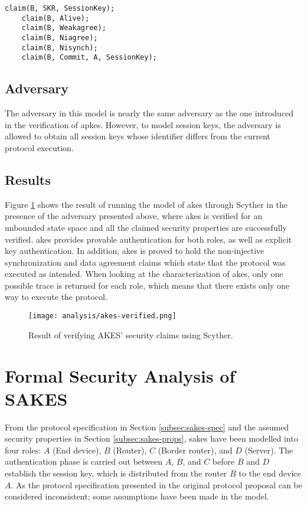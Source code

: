 \begin{lstlisting}[caption={Security claims for role B in AKES.}, label={lst:claims-b-akes}, style=code-listings]
	claim(B, SKR, SessionKey);
	claim(B, Alive);
	claim(B, Weakagree);
	claim(B, Niagree);
	claim(B, Nisynch);
	claim(B, Commit, A, SessionKey);
\end{lstlisting}

\subsection{Adversary}

The adversary in this model is nearly the same adversary as the one introduced in the verification of \gls{apkes}. However, to model session keys, the adversary is allowed to obtain all session keys whose identifier differs from the current protocol execution. 

\subsection{Results}

Figure \ref{fig:akes-verified} shows the result of running the model of \gls{akes} through Scyther in the presence of the adversary presented above, where \gls{akes} is verified for an unbounded state space and all the claimed security properties are successfully verified. \gls{akes} provides provable authentication for both roles, as well as explicit key authentication. In addition, \gls{akes} is proved to hold the non-injective synchronization and data agreement claims which state that the protocol was executed as intended. When looking at the characterization of \gls{akes}, only one possible trace is returned for each role, which means that there exists only one way to execute the protocol.

\begin{figure}[h]
	\centering
	\texttt{[image: analysis/akes-verified.png]}
	\caption{Result of verifying AKES' security claims using Scyther.}
	\label{fig:akes-verified}
\end{figure}


\section{Formal Security Analysis of SAKES}
\label{sec:sakes-analysis}

From the protocol specification in Section \ref{subsec:sakes-spec} and the assumed security properties in Section \ref{subsec:sakes-props}, \gls{sakes} have been modelled into four roles: $A$ (End device), $B$ (Router), $C$ (Border router), and $D$ (Server). The authentication phase is carried out between $A$, $B$, and $C$ before $B$ and $D$ establish the session key, which is distributed from the router $B$ to the end device $A$. As the protocol specification presented in the original protocol proposal can be considered inconsistent; some assumptions have been made in the model.

